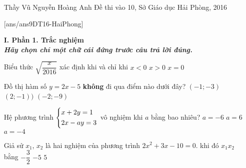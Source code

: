 \begin{name}
{Thầy Vũ Nguyễn Hoàng Anh}
{Đề thi vào 10, Sở Giáo dục Hải Phòng, 2016}
\end{name}
\setcounter{ex}{0}
[ans/ans9DT16-HaiPhong]

\textbf{I. Phần 1. Trắc nghiệm}\\
\textbf{\textit{Hãy chọn chỉ một chữ cái đứng trước câu trả lời đúng.}}

\begin{ex}%
Biểu thức $\sqrt{\dfrac{x}{2016}}$ xác định khi và chỉ khi
{$x<0$}
{$x>0$}
{$x=0$}
\end{ex}

\begin{ex}%
Đồ thị hàm số $y=2x-5$ \textbf{không} đi qua điểm nào dưới đây?
{\True $(-1;-3)$}
{$(2;-1))$}
{$(-2;-9)$}
\end{ex}

\begin{ex}%
Hệ phương trình $\left\{\begin{aligned}&x+2y=1\\ &2x-ay=3\end{aligned}\right.$ vô nghiệm khi $a$ bằng bao nhiêu?
{$a=-6$}
{$a=6$}
{\True $a=-4$}
\end{ex}

\begin{ex}%
Giả sử $x_1$, $x_2$ là hai nghiệm của phương trình $2x^2+3x-10=0$. khi đó $x_1x_2$ bằng
{$-\dfrac{3}{2}$}
{$-5$}
{$5$}
\end{ex}

\begin{ex}%
{
}
\end{ex}

